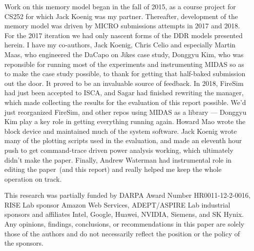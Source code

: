 Work on this memory model began in the fall of 2015, as a course project for
CS252 for which Jack Koenig was my partner. Thereafter, development of the
memory model was driven by MICRO submissions attempts in 2017 and 2018. For the
2017 iteration we had only nascent forms of the DDR models presented herein. I
have my co-authors, Jack Koenig, Chris Celio and especially Martin Maas, who
engineered the DaCapo on Jikes case study, Donggyu Kim, who was reponsible for
running most of the experiments and instrumenting MIDAS so as to make the case
study possible, to thank for getting that half-baked submission out the door.
It proved to be an invaluable source of feedback.  In 2018, FireSim had just
been accepted to ISCA, and Sagar had finished rewriting the manager, which made
collecting the results for the evaluation of this report possible. We'd just
reorganized FireSim, and other repos using MIDAS as a library --- Donggyu Kim
play a key role in getting everything running again.  Howard Mao wrote the
block device and maintained much of the system software.  Jack Koenig wrote
many of the plotting scripts used in the evaluation, and made an eleventh hour
push to get command-trace driven power analysis working, which ultimately
didn't make the paper. Finally, Andrew Waterman had instrumental role in
editing the paper~(and this report) and really helped me keep the whole
operation on track.

This research was partially funded by DARPA Award Number HR0011-12-2-0016,
RISE Lab sponsor Amazon Web Services, ADEPT/ASPIRE
Lab industrial sponsors and affiliates Intel, Google,
Huawei, NVIDIA, Siemens, and SK Hynix. Any opinions, findings,
conclusions, or recommendations in this paper are solely those of the
authors and do not necessarily reflect the position or the policy of
the sponsors.
